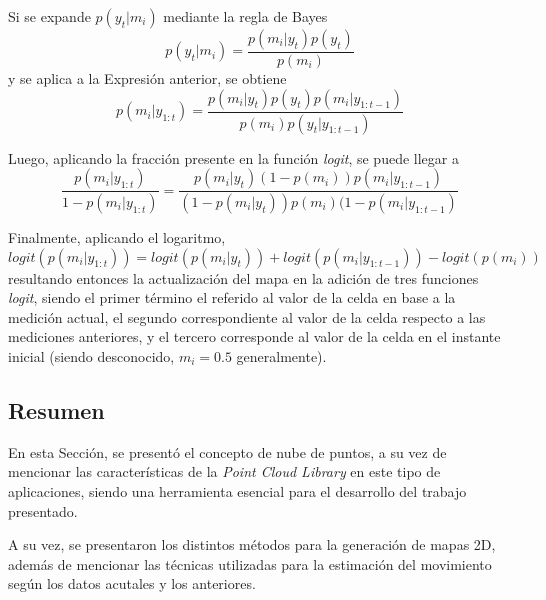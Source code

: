 Si se expande $p(y_t|m_i)$ mediante la regla de Bayes
\begin{equation}
    p(y_t|m_i) = \frac{p(m_i|y_t)p(y_t)}{p(m_i)}
\end{equation}
y se aplica a la Expresión anterior, se obtiene
\begin{equation}
    p(m_i|y_{1:t}) = \frac{p(m_i|y_t)p(y_t)p(m_i|y_{1:t-1})}{p(m_i)p(y_t|y_{1:t-1})}
\end{equation}

Luego, aplicando la fracción presente en la función \textit{logit}, se puede llegar a
\begin{equation}
    \frac{p(m_i|y_{1:t})}{1-p(m_i|y_{1:t})} = \frac{p(m_i|y_t)(1-p(m_i))p(m_i|y_{1:t-1})}{(1-p(m_i|y_t))p(m_i)(1-p(m_i|y_{1:t-1})}
\end{equation}

Finalmente, aplicando el logaritmo,
\begin{equation}
    logit(p(m_i|y_{1:t})) = logit(p(m_i|y_t)) + logit(p(m_i|y_{1:t-1})) - logit(p(m_i))
    \label{eq:logitupdatemap}
\end{equation}
resultando entonces la actualización del mapa en la adición de tres funciones \textit{logit}, siendo el primer término el referido al valor de la celda en base a la medición actual, el segundo correspondiente al valor de la celda respecto a las mediciones anteriores, y el tercero corresponde al valor de la celda en el instante inicial (siendo desconocido, $m_i = 0.5$ generalmente).

\subsection{Resumen}
En esta Sección, se presentó el concepto de nube de puntos, a su vez de mencionar las características de la \textit{Point Cloud Library} en este tipo de aplicaciones, siendo una herramienta esencial para el desarrollo del trabajo presentado.

A su vez, se presentaron los distintos métodos para la generación de mapas 2D, además de mencionar las técnicas utilizadas para la estimación del movimiento según los datos acutales y los anteriores.
